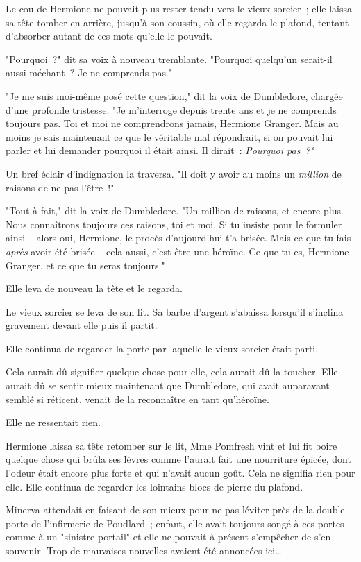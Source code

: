Le cou de Hermione ne pouvait plus rester tendu vers le vieux sorcier~; elle laissa sa tête tomber en arrière, jusqu'à son coussin, où elle regarda le plafond, tentant d'absorber autant de ces mots qu'elle le pouvait.

"Pourquoi~?" dit sa voix à nouveau tremblante. "Pourquoi quelqu'un serait-il aussi méchant~? Je ne comprends pas."

"Je me suis moi-même posé cette question," dit la voix de Dumbledore, chargée d'une profonde tristesse. "Je m'interroge depuis trente ans et je ne comprends toujours pas. Toi et moi ne comprendrons jamais, Hermione Granger. Mais au moins je sais maintenant ce que le véritable mal répondrait, si on pouvait lui parler et lui demander pourquoi il était ainsi. Il dirait~: \emph{Pourquoi pas~?"}

Un bref éclair d'indignation la traversa. "Il doit y avoir au moins un \emph{million} de raisons de ne pas l'être~!"

"Tout à fait," dit la voix de Dumbledore. "Un million de raisons, et encore plus. Nous connaîtrons toujours ces raisons, toi et moi. Si tu insiste pour le formuler ainsi -- alors oui, Hermione, le procès d'aujourd'hui t'a brisée. Mais ce que tu fais \emph{après} avoir été brisée -- cela aussi, c'est être une héroïne. Ce que tu es, Hermione Granger, et ce que tu seras toujours."

Elle leva de nouveau la tête et le regarda.

Le vieux sorcier se leva de son lit. Sa barbe d'argent s'abaissa lorsqu'il s'inclina gravement devant elle puis il partit.

Elle continua de regarder la porte par laquelle le vieux sorcier était parti.

Cela aurait dû signifier quelque chose pour elle, cela aurait dû la toucher. Elle aurait dû se sentir mieux maintenant que Dumbledore, qui avait auparavant semblé si réticent, venait de la reconnaître en tant qu'héroïne.

Elle ne ressentait rien.

Hermione laissa sa tête retomber sur le lit, Mme Pomfresh vint et lui fit boire quelque chose qui brûla ses lèvres comme l'aurait fait une nourriture épicée, dont l'odeur était encore plus forte et qui n'avait aucun goût. Cela ne signifia rien pour elle. Elle continua de regarder les lointains blocs de pierre du plafond.

\later

Minerva attendait en faisant de son mieux pour ne pas léviter près de la double porte de l'infirmerie de Poudlard~; enfant, elle avait toujours songé à ces portes comme à un "sinistre portail" et elle ne pouvait à présent s'empêcher de s'en souvenir. Trop de mauvaises nouvelles avaient été annoncées ici…


